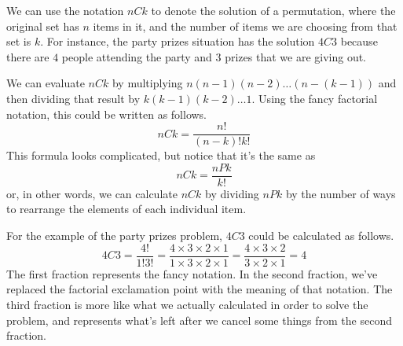 \documentclass{ximera}
\begin{document}
We can use the notation $nCk$ to denote the solution of a permutation, where the original set has $n$ items in it, and the number of items we are choosing from that set is $k$. For instance, the party prizes situation has the solution $4C3$ because there are $4$ people attending the party and $3$ prizes that we are giving out. 

We can evaluate $nCk$ by multiplying $n (n-1) (n-2) \dots (n-(k-1))$ and then dividing that result by $k (k-1) (k-2) \dots 1$. Using the fancy factorial notation, this could be written as follows.
\[
nCk = \frac{n!}{(n-k)! k!}
\]
This formula looks complicated, but notice that it's the same as
\[
nCk = \frac{nPk}{k!}
\]
or, in other words, we can calculate $nCk$ by dividing $nPk$ by the number of ways to rearrange the elements of each individual item. 


For the example of the party prizes problem, $4C3$ could be calculated as follows.
\[
4C3 = \frac{4!}{1!3!} =\frac{4 \times 3 \times 2 \times 1}{1 \times 3 \times 2 \times 1} =  \frac{4 \times 3 \times 2}{3 \times 2 \times 1} = 4
\]
The first fraction represents the fancy notation. In the second fraction, we've replaced the factorial exclamation point with the meaning of that notation. The third fraction is more like what we actually calculated in order to solve the problem, and represents what's left after we cancel some things from the second fraction.
\end{document}
